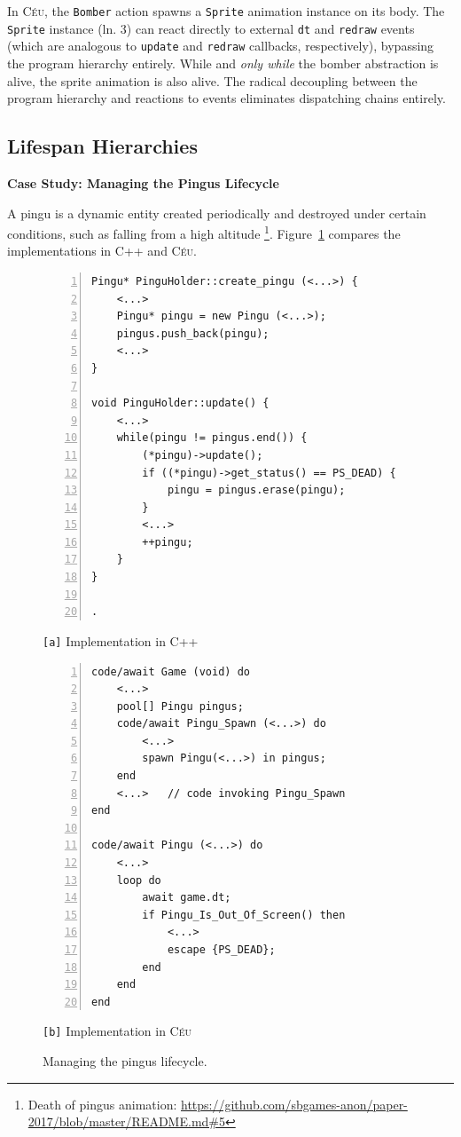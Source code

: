 \documentclass{vgtc}                          %
\newcommand{\CEU}{\textsc{C\'{e}u}\xspace}
\newcommand{\code}[1] {{\small{\texttt{#1}}}}
\newcommand{\ax}{\code{[a]}\xspace}
\newcommand{\bx}{\code{[b]}\xspace}
\begin{document}
In \CEU, the \code{Bomber} action spawns a \code{Sprite} animation instance on
its body.
%
The \code{Sprite} instance (ln. 3) can react directly to external \code{dt} and
\code{redraw} events (which are analogous to \code{update} and \code{redraw}
callbacks, respectively), bypassing the program hierarchy entirely.
While and \emph{only while} the bomber abstraction is alive, the sprite
animation is also alive.
The radical decoupling between the program hierarchy and reactions to events
eliminates dispatching chains entirely.

\subsection{Lifespan Hierarchies}

\textbf{Case Study: Managing the Pingus Lifecycle}


A pingu is a dynamic entity created periodically and destroyed under certain
conditions, such as falling from a high altitude%
\footnote{Death of pingus animation: \url{https://github.com/sbgames-anon/paper-2017/blob/master/README.md#5} }.
%
Figure~\ref{lst.pingus} compares the implementations in C++ and \CEU.

\begin{figure}[t]
\begin{minipage}[t]{0.50\linewidth}
\begin{lstlisting}[numbers=left,xleftmargin=3em]
Pingu* PinguHolder::create_pingu (<...>) {
    <...>
    Pingu* pingu = new Pingu (<...>);
    pingus.push_back(pingu);
    <...>
}

void PinguHolder::update() {
    <...>
    while(pingu != pingus.end()) {
        (*pingu)->update();
        if ((*pingu)->get_status() == PS_DEAD) {
            pingu = pingus.erase(pingu);
        }
        <...>
        ++pingu;
    }
}

.
\end{lstlisting}
\centering\small{\ax Implementation in C++}
\end{minipage}
%
\begin{minipage}[t]{0.50\linewidth}
\begin{lstlisting}[numbers=left,xleftmargin=3em]
code/await Game (void) do
    <...>
    pool[] Pingu pingus;
    code/await Pingu_Spawn (<...>) do
        <...>
        spawn Pingu(<...>) in pingus;
    end
    <...>   // code invoking Pingu_Spawn
end

code/await Pingu (<...>) do
    <...>
    loop do
        await game.dt;
        if Pingu_Is_Out_Of_Screen() then
            <...>
            escape {PS_DEAD};
        end
    end
end
\end{lstlisting}
\centering\small{\bx Implementation in \CEU}
\end{minipage}
\caption{ Managing the pingus lifecycle.
\label{lst.pingus}
}
\end{figure}
\end{document}
